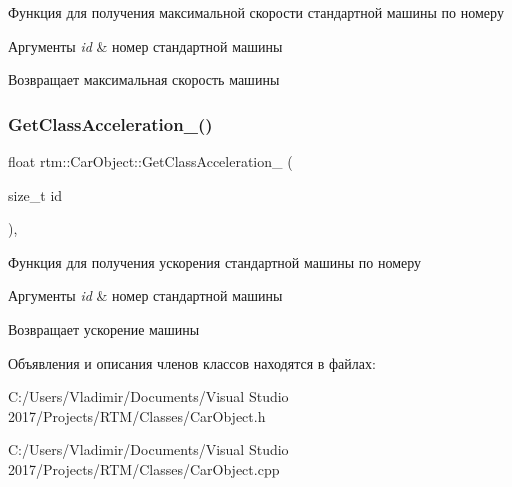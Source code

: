 Функция для получения максимальной скорости стандартной машины по номеру 
\begin{DoxyParams}{Аргументы}
{\em id} & номер стандартной машины \\
\hline
\end{DoxyParams}
\begin{DoxyReturn}{Возвращает}
максимальная скорость машины 
\end{DoxyReturn}
\mbox{\label{classrtm_1_1_car_object_a45d798bf2079173c677358b4b54d4e2b}} 
\subsubsection{\texorpdfstring{Get\+Class\+Acceleration\+\_\+()}{GetClassAcceleration\_()}}
{\footnotesize\ttfamily float rtm\+::\+Car\+Object\+::\+Get\+Class\+Acceleration\+\_\+ (\begin{DoxyParamCaption}\item[{size\+\_\+t}]{id }\end{DoxyParamCaption})\hspace{0.3cm}{\ttfamily [static]}, {\ttfamily [private]}}

Функция для получения ускорения стандартной машины по номеру 
\begin{DoxyParams}{Аргументы}
{\em id} & номер стандартной машины \\
\hline
\end{DoxyParams}
\begin{DoxyReturn}{Возвращает}
ускорение машины 
\end{DoxyReturn}


Объявления и описания членов классов находятся в файлах\+:\begin{DoxyCompactItemize}
\item 
C\+:/\+Users/\+Vladimir/\+Documents/\+Visual Studio 2017/\+Projects/\+R\+T\+M/\+Classes/Car\+Object.\+h\item 
C\+:/\+Users/\+Vladimir/\+Documents/\+Visual Studio 2017/\+Projects/\+R\+T\+M/\+Classes/Car\+Object.\+cpp\end{DoxyCompactItemize}
